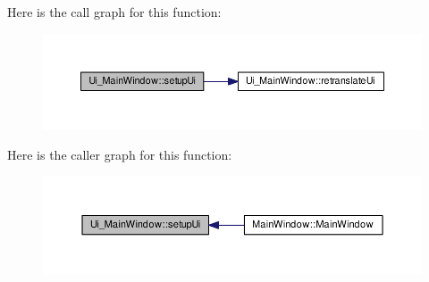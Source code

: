 Here is the call graph for this function\-:\nopagebreak
\begin{figure}[H]
\begin{center}
\leavevmode
\includegraphics[width=350pt]{class_ui___main_window_acf4a0872c4c77d8f43a2ec66ed849b58_cgraph}
\end{center}
\end{figure}




Here is the caller graph for this function\-:\nopagebreak
\begin{figure}[H]
\begin{center}
\leavevmode
\includegraphics[width=350pt]{class_ui___main_window_acf4a0872c4c77d8f43a2ec66ed849b58_icgraph}
\end{center}
\end{figure}




